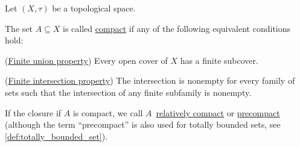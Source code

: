Let $(X, \tau)$ be a topological space.

\begin{definition}\label{def:compact_set}\cite[40]{Deimling1985}
  The set $A \subseteq X$ is called \uline{compact} if any of the following equivalent conditions hold:
  \begin{defenum}
    \item\label{def:compact_set/union} (\uline{Finite union property}) Every open cover of $X$ has a finite subcover.
    \item\label{def:compact_set/intersection} (\uline{Finite intersection property}) The intersection is nonempty for every family of sets such that the intersection of any finite subfamily is nonempty.
  \end{defenum}

  If the closure if $A$ is compact, we call $A$~\uline{relatively compact} or \uline{precompact} (although the term \enquote{precompact} is also used for totally bounded sets, see \ref{def:totally_bounded_set}).
\end{definition}
